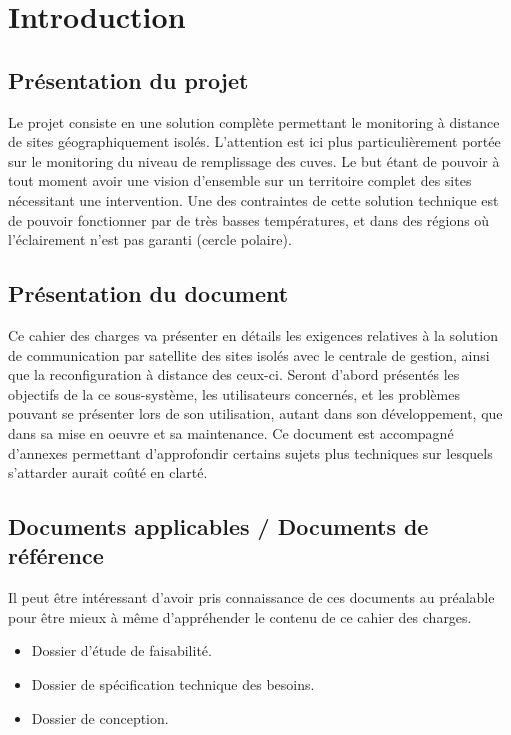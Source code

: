 \section{Introduction}

\subsection{Présentation du projet}

Le projet consiste en une solution complète permettant le monitoring à distance de sites géographiquement isolés. L'attention est ici plus particulièrement portée sur le monitoring du niveau de remplissage des cuves. Le but étant de pouvoir à tout moment avoir une vision d'ensemble sur un territoire complet des sites nécessitant une intervention. Une des contraintes de cette solution technique est de pouvoir fonctionner par de très basses températures, et dans des régions où l'éclairement n'est pas garanti (cercle polaire).

\subsection{Présentation du document}

Ce cahier des charges va présenter en détails les exigences relatives à la solution de communication par satellite des sites isolés avec le centrale de gestion, ainsi que la reconfiguration à distance des ceux-ci. Seront d'abord présentés les objectifs de la ce sous-système, les utilisateurs concernés, et les problèmes pouvant se présenter lors de son utilisation, autant dans son développement, que dans sa mise en oeuvre et sa maintenance. Ce document est accompagné d'annexes permettant d'approfondir certains sujets plus techniques sur lesquels s'attarder aurait coûté en clarté.

\subsection{Documents applicables / Documents de référence}

Il peut être intéressant d'avoir pris connaissance de ces documents au préalable pour être mieux à même d'appréhender le contenu de ce cahier des charges.

\begin{itemize}
\item Dossier d'étude de faisabilité.
\item Dossier de spécification technique des besoins.
\item Dossier de conception.
\end{itemize}

